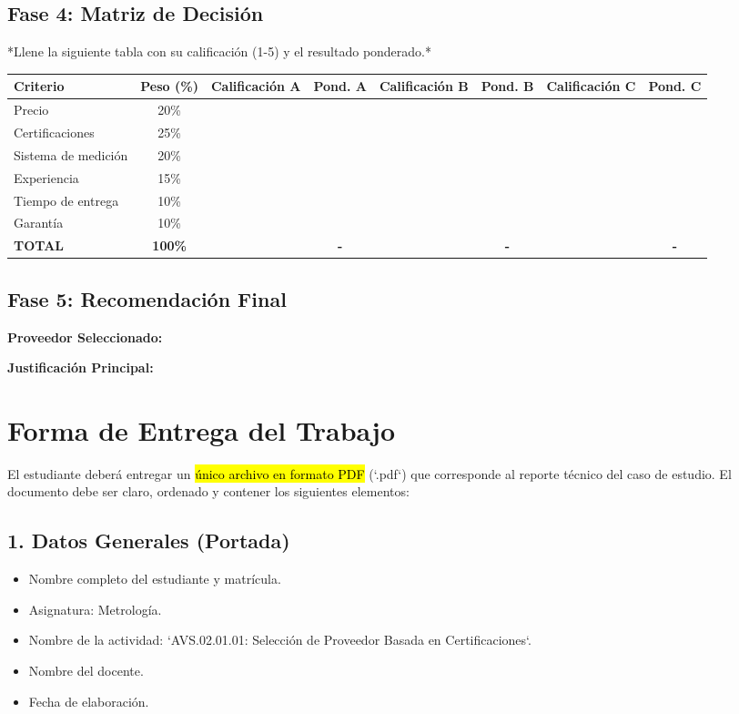 \documentclass{article}
\begin{document}
\subsection*{Fase 4: Matriz de Decisión}

*Llene la siguiente tabla con su calificación (1-5) y el resultado ponderado.*

\begin{tabular}{|l|c|c|c|c|c|c|c|}
\hline
\textbf{Criterio} & \textbf{Peso (\%)} & \textbf{Calificación A} & \textbf{Pond. A} & \textbf{Calificación B} & \textbf{Pond. B} & \textbf{Calificación C} & \textbf{Pond. C} \\
\hline
Precio & 20\% & & & & & & \\
Certificaciones & 25\% & & & & & & \\
Sistema de medición & 20\% & & & & & & \\
Experiencia & 15\% & & & & & & \\
Tiempo de entrega & 10\% & & & & & & \\
Garantía & 10\% & & & & & & \\
\hline
\textbf{TOTAL} & \textbf{100\%} & & \textbf{-} & & \textbf{-} & & \textbf{-} \\
\hline
\end{tabular}

\subsection*{Fase 5: Recomendación Final}

\textbf{Proveedor Seleccionado:}

\vspace{1cm}

\textbf{Justificación Principal:}

\vspace{3cm}

\section*{Forma de Entrega del Trabajo}

El estudiante deberá entregar un \hl{único archivo en formato PDF} (`.pdf`) que corresponde al reporte técnico del caso de estudio. El documento debe ser claro, ordenado y contener los siguientes elementos:

\subsection*{1. Datos Generales (Portada)}
\begin{itemize}
    \item Nombre completo del estudiante y matrícula.
    \item Asignatura: Metrología.
    \item Nombre de la actividad: `AVS.02.01.01: Selección de Proveedor Basada en Certificaciones`.
    \item Nombre del docente.
    \item Fecha de elaboración.
\end{itemize}
\end{document}
